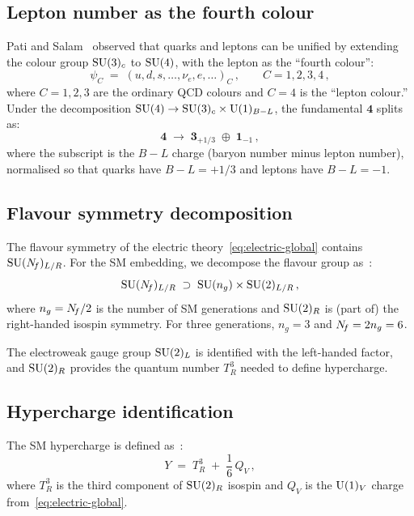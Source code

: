 \documentclass[11pt,a4paper]{article}
\begin{document}
\subsection{Lepton number as the fourth colour}

Pati and Salam~\cite{PS1974} observed that quarks and leptons can be
unified by extending the colour group $\mathrm{SU}(3)_c$ to $\mathrm{SU}(4)$, with the
lepton as the ``fourth colour'':
\begin{equation}\label{eq:pati-salam}
  \psi_C \;=\; (u, d, s, \ldots, \nu_e, e, \ldots)_C\,,
  \qquad C = 1,2,3,4\,,
\end{equation}
where $C = 1,2,3$ are the ordinary QCD colours and $C = 4$ is the
``lepton colour.''  Under the decomposition
$\mathrm{SU}(4) \to \mathrm{SU}(3)_c \times \mathrm{U}(1)_{B-L}$, the fundamental
$\mathbf{4}$ splits as:
\begin{equation}\label{eq:su4-decomp}
  \mathbf{4} \;\to\; \mathbf{3}_{+1/3} \;\oplus\; \mathbf{1}_{-1}\,,
\end{equation}
where the subscript is the $B-L$ charge (baryon number minus lepton
number), normalised so that quarks have $B-L = +1/3$ and leptons have
$B-L = -1$.

\subsection{Flavour symmetry decomposition}

The flavour symmetry of the electric theory~\eqref{eq:electric-global}
contains $\mathrm{SU}(N_{\!f})_{L/R}$.  For the SM embedding, we decompose the
flavour group as~\cite{CacciapagliaSannino2024}:
\begin{equation}\label{eq:flavour-decomp}
  \mathrm{SU}(N_{\!f})_{L/R}
  \;\supset\;
  \mathrm{SU}(n_g) \times \mathrm{SU}(2)_{L/R}\,,
\end{equation}
where $n_g = N_{\!f} / 2$ is the number of SM generations and $\mathrm{SU}(2)_R$
is (part of) the right-handed isospin symmetry.  For three generations,
$n_g = 3$ and $N_{\!f} = 2 n_g = 6$.

The electroweak gauge group $\mathrm{SU}(2)_L$ is identified with the
left-handed factor, and $\mathrm{SU}(2)_R$ provides the quantum number
$T_R^3$ needed to define hypercharge.

\subsection{Hypercharge identification}

The SM hypercharge is defined as~\cite{CacciapagliaSannino2024}:
\begin{equation}\label{eq:hypercharge}
  \boxed{Y \;=\; T_R^3 \;+\; \frac{1}{6}\, Q_V\,,}
\end{equation}
where $T_R^3$ is the third component of $\mathrm{SU}(2)_R$ isospin and $Q_V$
is the $\mathrm{U}(1)_V$ charge from~\eqref{eq:electric-global}.
\end{document}
